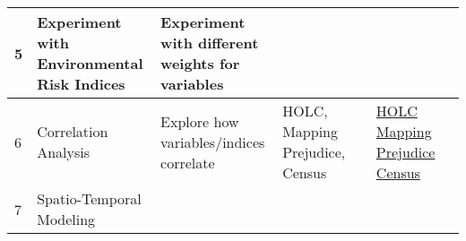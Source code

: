 \documentclass[article,12pt]{article}
\numberwithin{equation}{section}
\begin{document}
{\begin{tabular}{|l|p{.2\linewidth}|p{.2\linewidth}|p{.2\linewidth}|p{.1\linewidth}|p{.1\linewidth}|p{.1\linewidth}|}
		5 & Experiment with Environmental Risk Indices & Experiment with different weights for variables                &                                         &                                                   &                                                                                                                                                                                                         &             \\ \hline
		6 & Correlation Analysis                       & Explore how variables/indices correlate                        & HOLC, Mapping Prejudice, Census         &                                                   & \href{https://gisdata.mn.gov/dataset/us-mn-state-metc-plan-historic-holc-appraisal}{HOLC} \newline  \href{https://mappingprejudice.umn.edu/racial-covenants/maps-data}{Mapping Prejudice} \newline \href{https://data2.nhgis.org/main}{Census} &             \\ \hline
		7 & Spatio-Temporal Modeling                   &                                                                &                                         &                                                   &                                                                                                                                                                                                         &       \\ \hline     
	\end{tabular}
}
\end{document}
